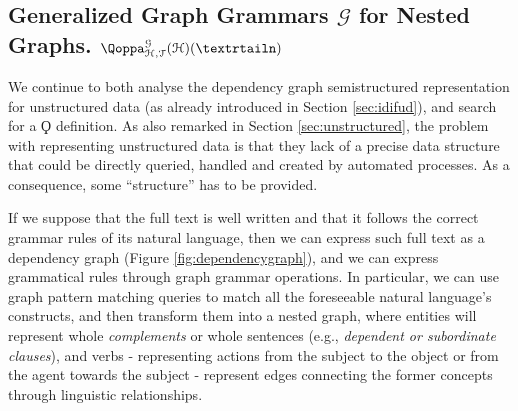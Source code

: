 
\subsection{Generalized Graph Grammars $\mathcal{G}$ for Nested Graphs. $\qtransl_{\mathcal{H},\mathcal{T}}^{\mathcal{G}}(\mathcal{H})(\nested)$}\label{subsec:gggSec}\label{sec:semistructunstradata}
 
We continue to both analyse the dependency graph semistructured representation for unstructured data (as already introduced in Section \vref{sec:idifud}), and search for a $\Qoppa$ definition. As also remarked in Section \vref{sec:unstructured}, the problem with representing unstructured data is that they lack of a precise data structure that could be directly queried, handled and created by automated processes. As a consequence, some ``structure'' has to be provided.
 
	If we suppose that the full text is well written and that it follows the correct grammar rules of its natural language, then we can express such full text as a dependency graph (Figure \vref{fig:dependencygraph}), and we can express grammatical rules through graph grammar operations. In particular, we can use graph pattern matching queries to match all the foreseeable natural language's constructs, and then transform them into a nested graph, where entities will represent whole \textit{complements} or whole sentences (e.g., \textit{dependent or subordinate clauses}), and verbs - representing actions from the subject to the object or from the agent towards the subject - represent edges connecting the former concepts through linguistic relationships. 
	

